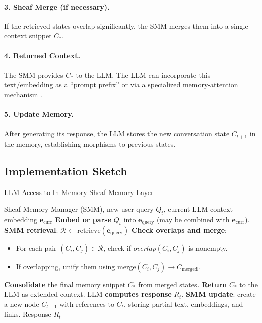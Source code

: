 \documentclass{article}
\begin{document}
\paragraph{3. Sheaf Merge (if necessary).}
If the retrieved states overlap significantly, the SMM merges them into a single context snippet $C_{*}$.

\paragraph{4. Returned Context.}
The SMM provides $C_{*}$ to the LLM. The LLM can incorporate this text/embedding as a “prompt prefix” or via a specialized memory-attention mechanism \citep{lewis2020retrieval}.

\paragraph{5. Update Memory.}
After generating its response, the LLM stores the new conversation state $C_{t+1}$ in the memory, establishing morphisms to previous states.

\subsection{Implementation Sketch}

\begin{algorithm}[h]
\caption{LLM Access to In-Memory Sheaf-Memory Layer}
\label{alg:inmem_sheaf}
\begin{algorithmic}[1]
\REQUIRE Sheaf-Memory Manager (SMM), new user query $Q_t$, current LLM context embedding $\mathbf{e}_{\text{curr}}$
\STATE \textbf{Embed or parse} $Q_t$ into $\mathbf{e}_{\text{query}}$ (may be combined with $\mathbf{e}_{\text{curr}}$).
\STATE \textbf{SMM retrieval}: $\mathcal{R} \leftarrow \text{retrieve}(\mathbf{e}_{\text{query}})$ 
\STATE \textbf{Check overlaps and merge}:
    \begin{itemize}
        \item For each pair $(C_i, C_j) \in \mathcal{R}$, check if $overlap(C_i, C_j)$ is nonempty.
        \item If overlapping, unify them using $\text{merge}(C_i, C_j) \to C_{\mathrm{merged}}$.
    \end{itemize}
\STATE \textbf{Consolidate} the final memory snippet $C_{*}$ from merged states.
\STATE \textbf{Return} $C_{*}$ to the LLM as extended context.
\STATE LLM \textbf{computes response} $R_t$.
\STATE \textbf{SMM update}: create a new node $C_{t+1}$ with references to $C_{t}$, storing partial text, embeddings, and links.
\RETURN Response $R_t$
\end{algorithmic}
\end{algorithm}
\end{document}
